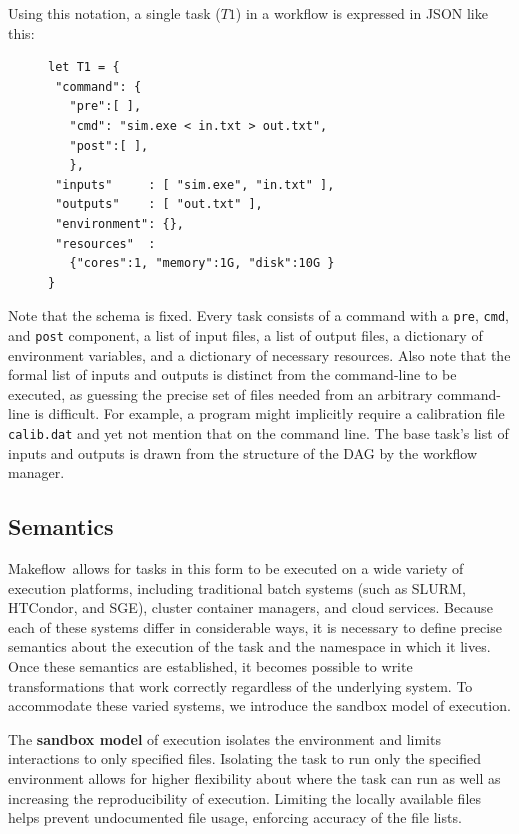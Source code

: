 \documentclass[conference]{IEEEtran}
\newcommand{\mf}{Makeflow\ }
\begin{document}
Using this notation, a single task ($T1$) in a workflow
is expressed in JSON like this:

\begin{figure}[H]
\begin{framed}
\begin{verbatim}
let T1 = {
 "command": {
   "pre":[ ],
   "cmd": "sim.exe < in.txt > out.txt",
   "post":[ ], 
   },
 "inputs"     : [ "sim.exe", "in.txt" ],
 "outputs"    : [ "out.txt" ],
 "environment": {},
 "resources"  :
   {"cores":1, "memory":1G, "disk":10G }
}
\end{verbatim}
\end{framed}
\label{basic-task}
\end{figure}

Note that the schema is fixed.
Every task consists of a command with a \verb$pre$, \verb$cmd$, and \verb$post$ component, a list of input files, a list of output files,
a dictionary of environment variables, 
and a dictionary of necessary resources.  
Also note that the formal list of
inputs and outputs is distinct from the command-line to be executed,
as guessing the precise set of files needed from 
an arbitrary command-line is difficult.  For example,
a program might implicitly require a calibration file {\tt calib.dat}
and yet not mention that on the command line.  
The base task's list of inputs
and outputs is drawn from the structure of the DAG by the workflow
manager.



\subsection{Semantics}
\label{sec:sandboxing}

\mf allows for tasks in this form to be executed on a wide
variety of execution platforms, including traditional batch
systems (such as 
SLURM\cite{Jette02slurm:simple}, 
HTCondor\cite{condor-hunter}, 
and SGE\cite{Microsystems:2001:SGE:560889.792378}), 
cluster container managers, and cloud services.
Because each of these systems differ in considerable ways,
it is necessary to define precise semantics about the
execution of the task and the namespace in which it lives.
Once these semantics are established, it becomes possible
to write transformations that work correctly regardless of the underlying system.
To accommodate these varied systems, we introduce the
sandbox model of execution.

The {\bf sandbox model} of execution isolates the environment 
and limits interactions to only specified files.
Isolating the task to run only the specified environment allows for higher
flexibility about where the task can run as well as increasing the reproducibility
of execution. Limiting the locally available files helps
prevent undocumented file usage, enforcing accuracy of the
file lists.
\end{document}
